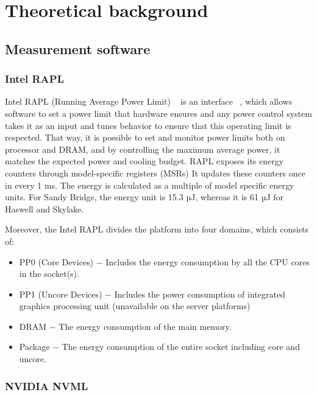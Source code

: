 \chapter{Theoretical background}

\section{Measurement software}

\subsection{Intel RAPL}

Intel RAPL (Running Average Power Limit)
~\cite{Power_Management_on_Intel_Microprocessor} is an interface
~\cite{RAPL_Power_Estimation_and_Capping}, which allows
software to set a power limit that hardware ensures and any
power control system takes it as an input and tunes behavior
to ensure that this operating limit is respected.
That way, it is possible to set and monitor power limits both
on processor and DRAM, and by controlling the maximum average
power, it matches the expected power and cooling budget. RAPL
exposes its energy counters through model-specific registers
(MSRs) It updates these counters once in every 1 ms. The energy
is calculated as a multiple of model specific energy units.
For Sandy Bridge, the energy unit is 15.3 µJ, whereas it is 61
µJ for Haswell and Skylake.

Moreover, the Intel RAPL divides the platform into four domains,
which consists of:

\begin{itemize}
    \item PP0 (Core Devices) $-$ Includes the energy consumption
    by all the CPU cores in the socket\@(s).
    \item PP1 (Uncore Devices) $-$ Includes the power consumption
    of integrated graphics processing unit (unavailable on the
    server platforms)
    \item DRAM $-$ The energy consumption of the main memory.
    \item Package $-$ The energy consumption of the entire socket
    including core and uncore.
\end{itemize}

\subsection{NVIDIA NVML}

